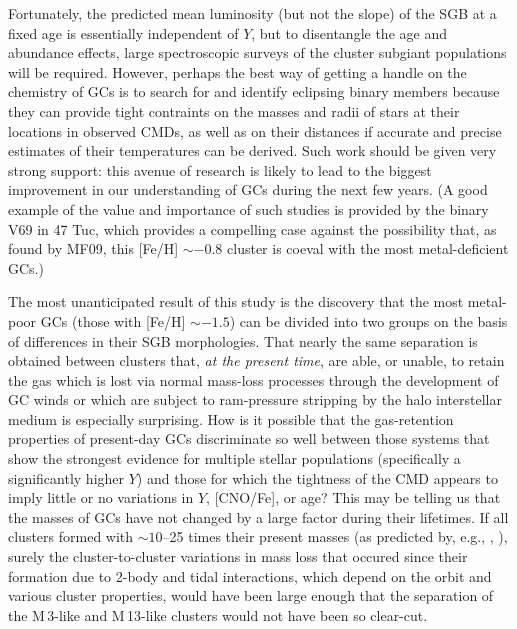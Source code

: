 \documentclass[12pt,preprint]{aastex}
\begin{document}
Fortunately, the predicted mean luminosity (but not the slope) of the SGB at a
fixed age is essentially independent of $Y$, but to disentangle the age and
abundance effects, large spectroscopic surveys of the cluster subgiant
populations will be required.  However, perhaps the best way of getting a
handle on the chemistry of GCs is to search for and identify eclipsing binary
members because they can provide tight contraints on the masses and radii of
stars at their locations in observed CMDs, as well as on their distances if
accurate and precise estimates of their temperatures can be derived.  Such work
should be given very strong support: this avenue of research is likely to lead
to the biggest improvement in our understanding of GCs during the next few
years.  (A good example of the value and importance of such studies is provided
by the binary V69 in 47 Tuc, which provides a compelling case against the
possibility that, as found by MF09, this [Fe/H] $\sim -0.8$ cluster is coeval
with the most metal-deficient GCs.)

The most unanticipated result of this study is the discovery that the most
metal-poor GCs (those with [Fe/H] $\sim -1.5$) can be divided into two groups
on the basis of differences in their SGB morphologies.  That nearly the same
separation is obtained between clusters that, {\it at the present time}, are
able, or unable, to retain the gas which is lost via normal mass-loss processes
through the development of GC winds or which are subject to ram-pressure
stripping by the halo interstellar medium is especially surprising.  How is it
possible that the gas-retention properties of present-day GCs discriminate so
well between those systems that show the strongest evidence for multiple stellar
populations (specifically a significantly higher $Y$) and those for which the
tightness of the CMD appears to imply little or no variations in $Y$, [CNO/Fe],
or age?   This may be telling us that the masses of GCs have not changed by a
large factor during their lifetimes.  If all clusters formed with $\sim 10$--25
times their present masses (as predicted by, e.g., \citealt{dvd08},
\citealt{con12}), surely the cluster-to-cluster variations in mass loss that 
occured since their formation due to 2-body and tidal interactions, which depend
on the orbit and various cluster properties, would have been large enough that
the separation of the M$\,$3-like and M$\,$13-like clusters would not have been
so clear-cut.
\end{document}
